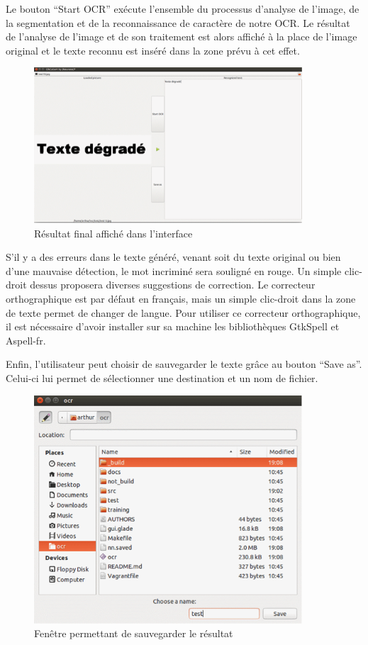 \documentclass[11pt]{report}
\begin{document}
Le bouton ``Start OCR'' exécute l'ensemble du processus d'analyse de l'image, de la segmentation et de la reconnaissance de caractère de notre OCR. Le résultat de l'analyse de l'image et de son traitement est alors affiché à la place de l'image original et le texte reconnu est inséré dans la zone prévu à cet effet.

\begin{figure}[htbp]
\centering
\includegraphics[width=10cm]{gui-result.png}
\caption{Résultat final affiché dans l'interface}
\end{figure}

S’il y a des erreurs dans le texte généré, venant soit du texte original ou bien d’une mauvaise détection, le mot incriminé sera souligné en rouge. Un simple clic-droit dessus proposera diverses suggestions de correction. Le correcteur orthographique est par défaut en français, mais un simple clic-droit dans la zone de texte permet de changer de langue. Pour utiliser ce correcteur orthographique, il est nécessaire d'avoir installer sur sa machine les bibliothèques GtkSpell et Aspell-fr.

Enfin, l'utilisateur peut choisir de sauvegarder le texte grâce au bouton  ``Save as''. Celui-ci lui permet de sélectionner une destination et un nom de fichier.

\begin{figure}[htbp]
\centering
\includegraphics[width=10cm]{gui-save.png}
\caption{Fenêtre permettant de sauvegarder le résultat}
\end{figure}
\end{document}
